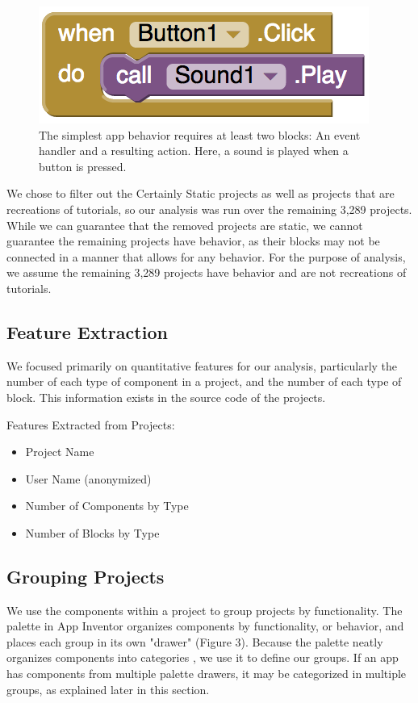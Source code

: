 \documentclass[conference]{IEEEtran}
\begin{document}
\begin{figure}[h!]
	\centering
	\includegraphics[width=0.55\linewidth]{simple_blocks.png}
	\caption{The simplest app behavior requires at least two blocks: An event handler and a resulting action. Here, a sound is played when a button is pressed.}
	\label{basic_blocks}
\end{figure}

We chose to filter out the Certainly Static projects as well as projects that are recreations of tutorials, so our analysis was run over the remaining 3,289 projects. While we can guarantee that the removed projects are static, we cannot guarantee the remaining projects have behavior, as their blocks may not be connected in a manner that allows for any behavior. For the purpose of analysis, we assume the remaining 3,289 projects have behavior and are not recreations of tutorials.

\subsection{Feature Extraction}
We focused primarily on quantitative features for our analysis, particularly the number of each type of component in a project, and the number of each type of block. This information exists in the source code of the projects. 


Features Extracted from Projects:
\begin{itemize}
	\item Project Name
	\item User Name (anonymized)
	\item Number of Components by Type
	\item Number of Blocks by Type
\end{itemize}

\subsection{Grouping Projects}
We use the components within a project to group projects by functionality. The palette in App Inventor organizes components by functionality, or behavior, and places each group in its own "drawer" (Figure 3). Because the palette neatly organizes components into categories , we use it to define our groups. If an app has components from multiple palette drawers, it may be categorized in multiple groups, as explained later in this section.
\end{document}
